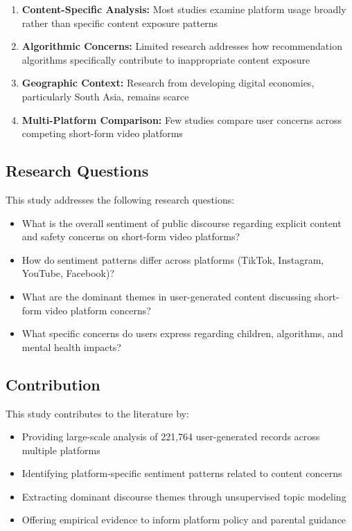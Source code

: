 \documentclass[12pt,a4paper]{article}
\begin{document}
\begin{enumerate}[leftmargin=*, itemsep=0.5em]
    \item \textbf{Content-Specific Analysis:} Most studies examine platform usage broadly rather than specific content exposure patterns \citep{valkenburg2022social}
    \item \textbf{Algorithmic Concerns:} Limited research addresses how recommendation algorithms specifically contribute to inappropriate content exposure \citep{ribeiro2020auditing}
    \item \textbf{Geographic Context:} Research from developing digital economies, particularly South Asia, remains scarce \citep{pew2023global}
    \item \textbf{Multi-Platform Comparison:} Few studies compare user concerns across competing short-form video platforms
\end{enumerate}

\subsection{Research Questions}

This study addresses the following research questions:

\begin{itemize}[leftmargin=*, itemsep=0.3em]
    \item[\textbf{RQ1:}] What is the overall sentiment of public discourse regarding explicit content and safety concerns on short-form video platforms?
    \item[\textbf{RQ2:}] How do sentiment patterns differ across platforms (TikTok, Instagram, YouTube, Facebook)?
    \item[\textbf{RQ3:}] What are the dominant themes in user-generated content discussing short-form video platform concerns?
    \item[\textbf{RQ4:}] What specific concerns do users express regarding children, algorithms, and mental health impacts?
\end{itemize}

\subsection{Contribution}

This study contributes to the literature by:
\begin{itemize}[leftmargin=*, itemsep=0.3em]
    \item Providing large-scale analysis of 221,764 user-generated records across multiple platforms
    \item Identifying platform-specific sentiment patterns related to content concerns
    \item Extracting dominant discourse themes through unsupervised topic modeling
    \item Offering empirical evidence to inform platform policy and parental guidance
\end{itemize}
\end{document}
